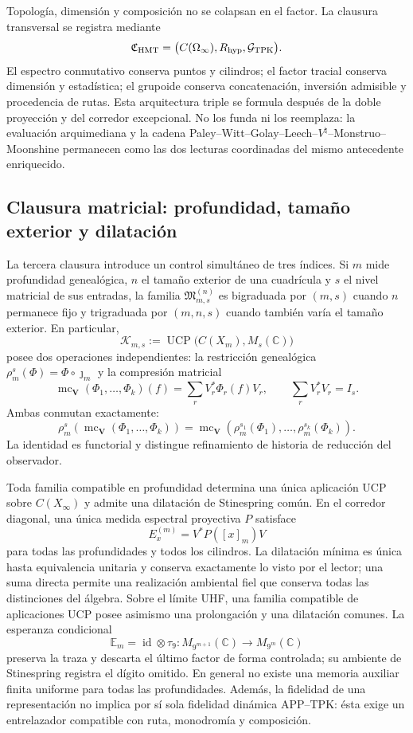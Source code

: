 Topología, dimensión y composición no se colapsan en el factor. La clausura
transversal se registra mediante
\[
 \mathfrak C_{\rm HMT}
 =\bigl(C(\Omega_\infty),R_{\rm hyp},\mathcal G_{\rm TPK}\bigr).
\]
El espectro conmutativo conserva puntos y cilindros; el factor tracial conserva
dimensión y estadística; el grupoide conserva concatenación, inversión
admisible y procedencia de rutas. Esta arquitectura triple se formula después
de la doble proyección y del corredor excepcional. No los funda ni los
reemplaza: la evaluación arquimediana y la cadena
Paley--Witt--Golay--Leech--\(V^\natural\)--Monstruo--Moonshine permanecen como
las dos lecturas coordinadas del mismo antecedente enriquecido.

\subsection*{Clausura matricial: profundidad, tamaño exterior y dilatación}

La tercera clausura introduce un control simultáneo de tres índices. Si
\(m\) mide profundidad genealógica, \(n\) el tamaño exterior de una cuadrícula
y \(s\) el nivel matricial de sus entradas, la familia
\(\mathfrak M_{m,s}^{(n)}\) es bigraduada por \((m,s)\) cuando \(n\) permanece
fijo y trigraduada por \((m,n,s)\) cuando también varía el tamaño exterior.
En particular,
\[
 \mathcal K_{m,s}
 :=\operatorname{UCP}\!\bigl(C(X_m),M_s(\mathbb C)\bigr)
\]
posee dos operaciones independientes: la restricción genealógica
\(\rho_m^s(\Phi)=\Phi\circ\jmath_m\) y la compresión matricial
\[
 \operatorname{mc}_{\boldsymbol V}(\Phi_1,\ldots,\Phi_k)(f)
 =\sum_rV_r^*\Phi_r(f)V_r,
 \qquad \sum_rV_r^*V_r=I_s.
\]
Ambas conmutan exactamente:
\[
 \rho_m^s\!\left(\operatorname{mc}_{\boldsymbol V}(\Phi_1,\ldots,\Phi_k)\right)
 =\operatorname{mc}_{\boldsymbol V}\!\left(
   \rho_m^{s_1}(\Phi_1),\ldots,\rho_m^{s_k}(\Phi_k)\right).
\]
La identidad es functorial y distingue refinamiento de historia de reducción
del observador.

Toda familia compatible en profundidad determina una única aplicación UCP
sobre \(C(X_\infty)\) y admite una dilatación de Stinespring común. En el
corredor diagonal, una única medida espectral proyectiva \(P\) satisface
\[
 E_x^{(m)}=V^*P([x]_m)V
\]
para todas las profundidades y todos los cilindros. La dilatación mínima es
única hasta equivalencia unitaria y conserva exactamente lo visto por el
lector; una suma directa permite una realización ambiental fiel que conserva
todas las distinciones del álgebra. Sobre el límite UHF, una familia compatible
de aplicaciones UCP posee asimismo una prolongación y una dilatación comunes.
La esperanza condicional
\[
 \mathbb E_m=\operatorname{id}\otimes\tau_9:
 M_{9^{m+1}}(\mathbb C)\longrightarrow M_{9^m}(\mathbb C)
\]
preserva la traza y descarta el último factor de forma controlada; su ambiente
de Stinespring registra el dígito omitido. En general no existe una memoria
auxiliar finita uniforme para todas las profundidades. Además, la fidelidad de
una representación no implica por sí sola fidelidad dinámica APP--TPK: ésta
exige un entrelazador compatible con ruta, monodromía y composición.

